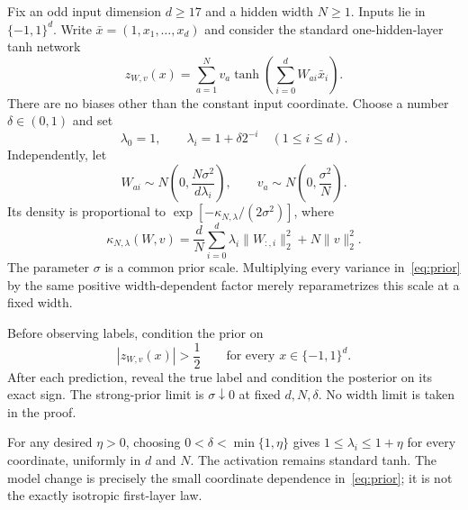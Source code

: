 \documentclass[11pt]{article}
\begin{document}
Fix an odd input dimension $d\ge17$ and a hidden width $N\ge1$.
Inputs lie in $\{-1,1\}^d$. Write $\bar x=(1,x_1,\ldots,x_d)$ and consider
the standard one-hidden-layer tanh network
\begin{equation}\label{eq:network}
 z_{W,v}(x)=\sum_{a=1}^N v_a\tanh\!\left(\sum_{i=0}^d W_{ai}\bar x_i\right).
\end{equation}
There are no biases other than the constant input coordinate.
Choose a number $\delta\in(0,1)$ and set
\begin{equation}\label{eq:lambda}
 \lambda_0=1,\qquad \lambda_i=1+\delta 2^{-i}\quad(1\le i\le d).
\end{equation}
Independently, let
\begin{equation}\label{eq:prior}
 W_{ai}\sim N\!\left(0,\frac{N\sigma^2}{d\lambda_i}\right),
 \qquad v_a\sim N\!\left(0,\frac{\sigma^2}{N}\right).
\end{equation}
Its density is proportional to $\exp[-\kappa_{N,\lambda}/(2\sigma^2)]$,
where
\begin{equation}\label{eq:energy}
 \kappa_{N,\lambda}(W,v)
 =\frac dN\sum_{i=0}^d\lambda_i\|W_{:,i}\|_2^2+N\|v\|_2^2.
\end{equation}
The parameter $\sigma$ is a common prior scale. Multiplying every variance
in~\eqref{eq:prior} by the same positive width-dependent factor merely
reparametrizes this scale at a fixed width.

Before observing labels, condition the prior on
\begin{equation}\label{eq:global-margin}
 |z_{W,v}(x)|>\frac12\qquad\text{for every }x\in\{-1,1\}^d.
\end{equation}
After each prediction, reveal the true label and condition the posterior
on its exact sign. The strong-prior limit is $\sigma\downarrow0$ at fixed
$d,N,\delta$. No width limit is taken in the proof.

For any desired $\eta>0$, choosing $0<\delta<\min\{1,\eta\}$ gives
$1\le\lambda_i\le1+\eta$ for every coordinate, uniformly in $d$ and $N$.
The activation remains standard tanh. The model change is precisely the
small coordinate dependence in~\eqref{eq:prior}; it is not the exactly
isotropic first-layer law.
\end{document}
